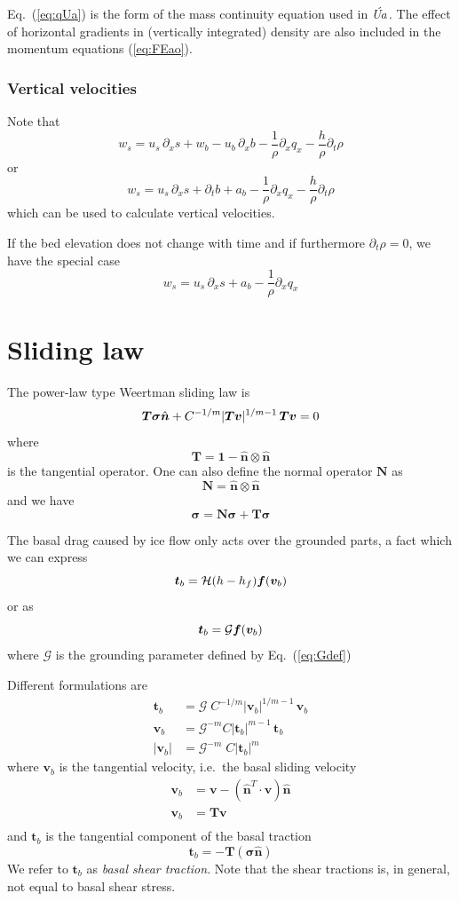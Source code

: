 \documentclass[10pt,a4paper]{book}
\newcommand{\He}{\mathcal{H}}
\newcommand{\G}{\mathcal{G}}
\newcommand{\p}{\partial}
\newcommand{\normal}{\hat{\bm{n}}}
\newcommand{\Ua}{\textsl{\'Ua}\,}
\begin{document}
Eq.~(\ref{eq:qUa}) is the form of the mass continuity equation used in
\Ua.  The effect of horizontal gradients in (vertically integrated)
density are also included in the momentum equations (\ref{eq:FEao}).


\subsubsection{Vertical velocities}

Note that
\[
w_s = u_s \, \p_x s +w_b - u_b \, \p_x b - \frac{1}{\rho} \p_x q_x - \frac{h}{\rho} \p_t \rho 
\]
or
\[
w_s = u_s \, \p_x s + \p_t b + a_b  - \frac{1}{\rho} \p_x q_x - \frac{h}{\rho} \p_t \rho 
\]
which can be used to calculate vertical velocities. 

If the bed elevation does not change with time and if furthermore
$\p_t \rho=0$, we have the special case
\[
w_s = u_s \, \p_x s + a_b  - \frac{1}{\rho} \p_x q_x 
\]



\section{Sliding law}
The power-law type Weertman sliding law is
\[
\bm{T} \bm{\sigma} \normal  + C^{-1/m} |\bm{T} \bm{v}|^{1/m-1} \, \bm{T} \bm{v} =0 \\
\]
where 
\[ 
\bm{T}= \bm{1} - \normal \otimes \normal
\]
is the tangential operator.  One can also define the normal operator $\bm{N}$ as
\[
\bm{N}= \normal \otimes \normal
\]
and we have
\[
\bm{\sigma}= \bm{N} \bm{\sigma} + \bm{T} \bm{\sigma}
\]

The basal drag caused by ice flow only acts over the grounded parts, a
fact which we can express
\[
\bm{t}_b  = \He(h-h_f) \bm{f}(\bm{v}_b)\\
\]
or as
\[
\bm{t}_b  = \G \bm{f}(\bm{v}_b)\\
\]
where
$\G$ is the grounding parameter defined by Eq.~(\ref{eq:Gdef})


Different formulations are
\begin{align}
\bm{t}_b  & = \G \; C^{-1/m} | \bm{v}_b|^{1/m-1} \, \bm{v}_b \label{eq:slida} \\
\bm{v}_b  & = \G^{-m} C | \bm{t}_b|^{m-1} \, \bm{t}_b \label{eq:slidb} \\
|\bm{v}_b|& = \G^{-m} \; C  | \bm{t}_b|^{m}  \label{eq:slidc}
\end{align}
where
$\bm{v}_b$ is the tangential velocity, i.e.\ the basal sliding velocity
\begin{align*}
\bm{v}_b&=\bm{v}-(\normal^T \cdot \bm{v}) \normal \\
\bm{v}_b&=\bm{T} \bm{v} \\
\end{align*}
and $\bm{t}_b$ is the tangential component of the basal traction
\[
\bm{t}_b = -\bm{T} (\bm{\sigma}  \normal)
\]
We refer to $\bm{t}_b$ as {\em basal shear traction}.  Note that the
shear tractions is, in general, not equal to basal shear stress.
\end{document}

